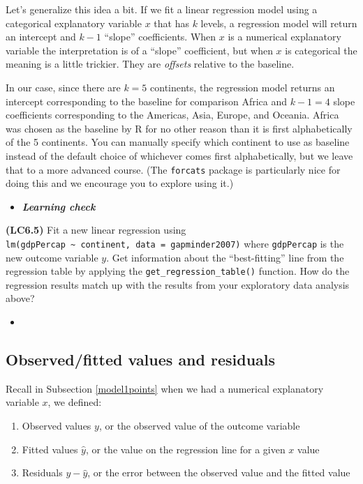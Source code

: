 \documentclass[12pt,]{krantz}
\providecommand{\tightlist}{%
  \setlength{\itemsep}{0pt}\setlength{\parskip}{0pt}}
\newenvironment{rmdblock}[1]
  {\begin{shaded*}
  \begin{itemize}
  \renewcommand{\labelitemi}{
    \raisebox{-.7\height}[0pt][0pt]{
    }
  }
  \item
  }
  {
  \end{itemize}
  \end{shaded*}
  }
\newenvironment{learncheck}
  {\begin{rmdblock}{warning}}
  {\end{rmdblock}}
\theoremstyle{definition}
\theoremstyle{definition}
\theoremstyle{definition}
\theoremstyle{remark}
\begin{document}
Let's generalize this idea a bit. If we fit a linear regression model
using a categorical explanatory variable \(x\) that has \(k\) levels, a
regression model will return an intercept and \(k - 1\) ``slope''
coefficients. When \(x\) is a numerical explanatory variable the
interpretation is of a ``slope'' coefficient, but when \(x\) is
categorical the meaning is a little trickier. They are \emph{offsets}
relative to the baseline.

In our case, since there are \(k = 5\) continents, the regression model
returns an intercept corresponding to the baseline for comparison Africa
and \(k - 1 = 4\) slope coefficients corresponding to the Americas,
Asia, Europe, and Oceania. Africa was chosen as the baseline by R for no
other reason than it is first alphabetically of the 5 continents. You
can manually specify which continent to use as baseline instead of the
default choice of whichever comes first alphabetically, but we leave
that to a more advanced course. (The \texttt{forcats} package is
particularly nice for doing this and we encourage you to explore using
it.)

\begin{learncheck}
\textbf{\emph{Learning check}}
\end{learncheck}

\textbf{(LC6.5)} Fit a new linear regression using
\texttt{lm(gdpPercap\ \textasciitilde{}\ continent,\ data\ =\ gapminder2007)}
where \texttt{gdpPercap} is the new outcome variable \(y\). Get
information about the ``best-fitting'' line from the regression table by
applying the \texttt{get\_regression\_table()} function. How do the
regression results match up with the results from your exploratory data
analysis above?

\begin{learncheck}

\end{learncheck}

\subsection{Observed/fitted values and residuals}\label{model2points}

Recall in Subsection \ref{model1points} when we had a numerical
explanatory variable \(x\), we defined:

\begin{enumerate}
\def\labelenumi{\arabic{enumi}.}
\tightlist
\item
  Observed values \(y\), or the observed value of the outcome variable
\item
  Fitted values \(\widehat{y}\), or the value on the regression line for
  a given \(x\) value
\item
  Residuals \(y - \widehat{y}\), or the error between the observed value
  and the fitted value
\end{enumerate}
\end{document}
